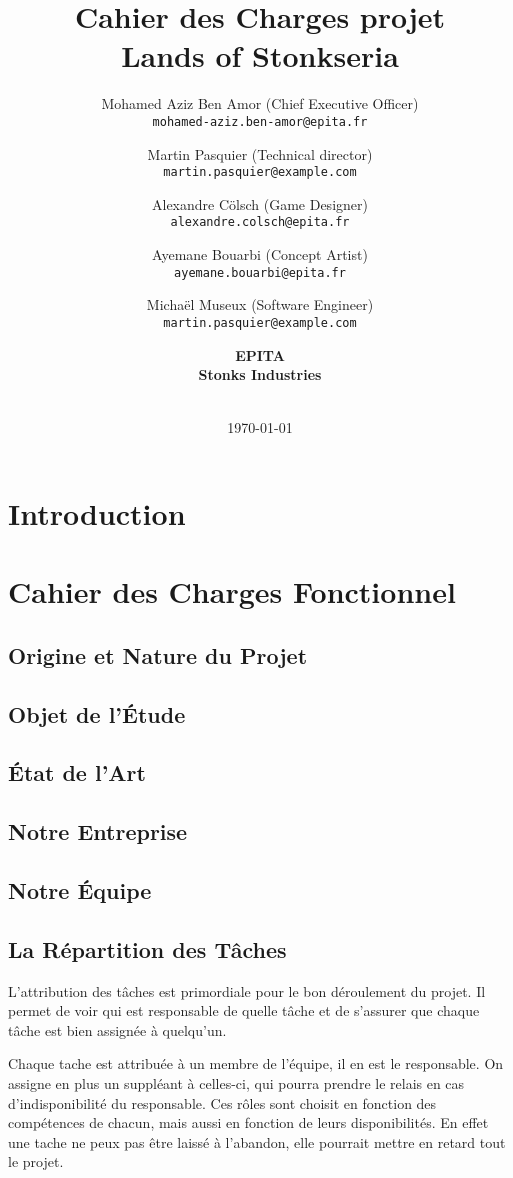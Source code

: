 \documentclass[11pt]{article}
\title{
    Cahier des Charges projet \\
    \textbf{Lands of Stonkseria}
    \vspace{7cm}
}
\author{
    Mohamed Aziz Ben Amor (Chief Executive Officer) \\
    \texttt{mohamed-aziz.ben-amor@epita.fr}
    \vspace{0.5cm}\and
    Martin Pasquier (Technical director) \\
    \texttt{martin.pasquier@example.com}
    \vspace{0.5cm}\and
    Alexandre Cölsch (Game Designer) \\
    \texttt{alexandre.colsch@epita.fr}
    \vspace{0.5cm}\and
    Ayemane Bouarbi (Concept Artist) \\
    \texttt{ayemane.bouarbi@epita.fr}
    \vspace{0.5cm}\and
    Michaël Museux (Software Engineer) \\
    \texttt{martin.pasquier@example.com}
    \vspace{1.5cm}\and
    \textbf{EPITA} \\
    \textbf{Stonks Industries} \\\\
}
\date{\today}
\begin{document}
\begin{titlepage}
    \maketitle
    \thispagestyle{empty} %
\end{titlepage}

\newpage
\tableofcontents

\newpage
\section{Introduction}


\newpage
\section{Cahier des Charges Fonctionnel}

\subsection{Origine et Nature du Projet}

\subsection{Objet de l'\'Etude}

\subsection{\'Etat de l'Art}

\subsection{Notre Entreprise}

\subsection{Notre \'Equipe}

\subsection{La Répartition des Tâches}

L'attribution des tâches est primordiale pour le bon déroulement du projet.
Il permet de voir qui est responsable de quelle tâche et de s'assurer que chaque tâche est bien assignée à quelqu'un. 

Chaque tache est attribuée à un membre de l'équipe, il en est le responsable.
On assigne en plus un suppléant à celles-ci, qui pourra prendre le relais en cas d'indisponibilité du responsable. 
Ces rôles sont choisit en fonction des compétences de chacun, mais aussi en fonction de leurs disponibilités. 
En effet une tache ne peux pas être laissé à l'abandon, elle pourrait mettre en retard tout le projet.
\end{document}
